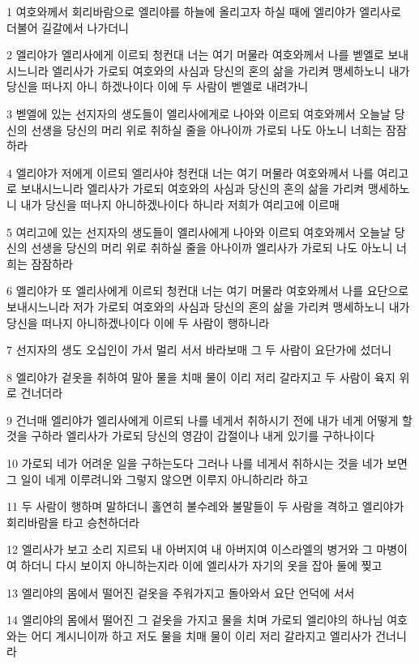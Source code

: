 \par 1 여호와께서 회리바람으로 엘리야를 하늘에 올리고자 하실 때에 엘리야가 엘리사로 더불어 길갈에서 나가더니
\par 2 엘리야가 엘리사에게 이르되 청컨대 너는 여기 머물라 여호와께서 나를 벧엘로 보내시느니라 엘리사가 가로되 여호와의 사심과 당신의 혼의 삶을 가리켜 맹세하노니 내가 당신을 떠나지 아니 하겠나이다 이에 두 사람이 벧엘로 내려가니
\par 3 벧엘에 있는 선지자의 생도들이 엘리사에게로 나아와 이르되 여호와께서 오늘날 당신의 선생을 당신의 머리 위로 취하실 줄을 아나이까 가로되 나도 아노니 너희는 잠잠하라
\par 4 엘리야가 저에게 이르되 엘리사야 청컨대 너는 여기 머물라 여호와께서 나를 여리고로 보내시느니라 엘리사가 가로되 여호와의 사심과 당신의 혼의 삶을 가리켜 맹세하노니 내가 당신을 떠나지 아니하겠나이다 하니라 저희가 여리고에 이르매
\par 5 여리고에 있는 선지자의 생도들이 엘리사에게 나아와 이르되 여호와께서 오늘날 당신의 선생을 당신의 머리 위로 취하실 줄을 아나이까 엘리사가 가로되 나도 아노니 너희는 잠잠하라
\par 6 엘리야가 또 엘리사에게 이르되 청컨대 너는 여기 머물라 여호와께서 나를 요단으로 보내시느니라 저가 가로되 여호와의 사심과 당신의 혼의 삶을 가리켜 맹세하노니 내가 당신을 떠나지 아니하겠나이다 이에 두 사람이 행하니라
\par 7 선지자의 생도 오십인이 가서 멀리 서서 바라보매 그 두 사람이 요단가에 섰더니
\par 8 엘리야가 겉옷을 취하여 말아 물을 치매 물이 이리 저리 갈라지고 두 사람이 육지 위로 건너더라
\par 9 건너매 엘리야가 엘리사에게 이르되 나를 네게서 취하시기 전에 내가 네게 어떻게 할 것을 구하라 엘리사가 가로되 당신의 영감이 갑절이나 내게 있기를 구하나이다
\par 10 가로되 네가 어려운 일을 구하는도다 그러나 나를 네게서 취하시는 것을 네가 보면 그 일이 네게 이루려니와 그렇지 않으면 이루지 아니하리라 하고
\par 11 두 사람이 행하며 말하더니 홀연히 불수레와 불말들이 두 사람을 격하고 엘리야가 회리바람을 타고 승천하더라
\par 12 엘리사가 보고 소리 지르되 내 아버지여 내 아버지여 이스라엘의 병거와 그 마병이여 하더니 다시 보이지 아니하는지라 이에 엘리사가 자기의 옷을 잡아 둘에 찢고
\par 13 엘리야의 몸에서 떨어진 겉옷을 주워가지고 돌아와서 요단 언덕에 서서
\par 14 엘리야의 몸에서 떨어진 그 겉옷을 가지고 물을 치며 가로되 엘리야의 하나님 여호와는 어디 계시니이까 하고 저도 물을 치매 물이 이리 저리 갈라지고 엘리사가 건너니라
